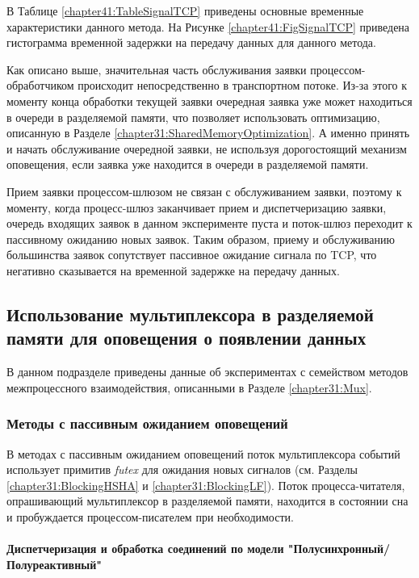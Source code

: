 В Таблице \ref{chapter41:TableSignalTCP} приведены основные временные характеристики данного метода. На Рисунке \ref{chapter41:FigSignalTCP} приведена гистограмма временной задержки на передачу данных для данного метода.

Как описано выше, значительная часть обслуживания заявки процессом-обработчиком происходит непосредственно в транспортном потоке. Из-за этого к моменту конца обработки текущей заявки очередная заявка уже может находиться в очереди в разделяемой памяти, что позволяет использовать оптимизацию, описанную в Разделе \ref{chapter31:SharedMemoryOptimization}. А именно принять и начать обслуживание очередной заявки, не используя дорогостоящий механизм оповещения, если заявка уже находится в очереди в разделяемой памяти. 

Прием заявки процессом-шлюзом не связан с обслуживанием заявки, поэтому к моменту, когда процесс-шлюз заканчивает прием и диспетчеризацию заявки, очередь входящих заявок в данном эксперименте пуста и поток-шлюз переходит к пассивному ожиданию новых заявок. Таким образом, приему и обслуживанию большинства заявок сопутствует пассивное ожидание сигнала по TCP, что негативно сказывается на временной задержке на передачу данных.

\subsection{Использование мультиплексора в разделяемой памяти для оповещения о появлении данных}

В данном подразделе приведены данные об экспериментах с семейством методов межпроцессного взаимодействия, описанными в Разделе \ref{chapter31:Mux}.

\subsubsection{Методы с пассивным ожиданием оповещений}

В методах с пассивным ожиданием оповещений поток мультиплексора событий использует примитив \textit{futex} 
для ожидания новых сигналов (см. Разделы \ref{chapter31:BlockingHSHA} и \ref{chapter31:BlockingLF}). Поток процесса-читателя, опрашивающий мультиплексор в разделяемой памяти, находится в состоянии сна и пробуждается процессом-писателем при необходимости.

\paragraph{Диспетчеризация и обработка соединений по модели "Полусинхронный/Полуреактивный"}


